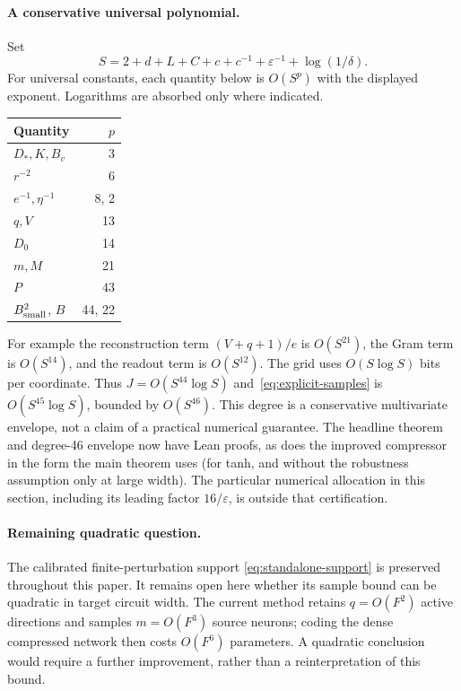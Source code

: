 \paragraph{A conservative universal polynomial.}
Set
\[
 S=2+d+L+C+c+c^{-1}+\varepsilon^{-1}+\log(1/\delta).
\]
For universal constants, each quantity below is $O(S^p)$ with the displayed
exponent. Logarithms are absorbed only where indicated.
\begin{center}
\begin{tabular}{lr}
\toprule
Quantity & $p$\\\midrule
$D_*,K,B_v$ & 3\\
$r^{-2}$ & 6\\
$e^{-1},\eta^{-1}$ & 8, 2\\
$q,V$ & 13\\
$D_0$ & 14\\
$m,M$ & 21\\
$P$ & 43\\
$B_{\rm small}^2$, $B$ & 44, 22\\
\bottomrule
\end{tabular}
\end{center}
For example the reconstruction term $(V+q+1)/e$ is $O(S^{21})$,
the Gram term is $O(S^{14})$, and the readout term is $O(S^{12})$.
The grid uses $O(S\log S)$ bits per coordinate. Thus
$J=O(S^{44}\log S)$ and~\eqref{eq:explicit-samples} is
$O(S^{45}\log S)$, bounded by $O(S^{46})$.
This degree is a conservative multivariate envelope, not a claim of a
practical numerical guarantee. The headline theorem and degree-46 envelope now have Lean proofs, as does
the improved compressor in the form the main theorem uses (for tanh, and
without the robustness assumption only at large width). The particular numerical allocation in this section, including
its leading factor $16/\varepsilon$, is outside that certification.

\paragraph{Remaining quadratic question.}
The calibrated finite-perturbation support
\eqref{eq:standalone-support} is preserved throughout this paper. It
remains open here whether its sample bound can be quadratic in target
circuit width. The current method retains $q=O(F^2)$ active directions and
samples $m=O(F^3)$ source neurons; coding the dense compressed network then
costs $O(F^6)$ parameters. A quadratic conclusion would require a further
improvement, rather than a reinterpretation of this bound.
